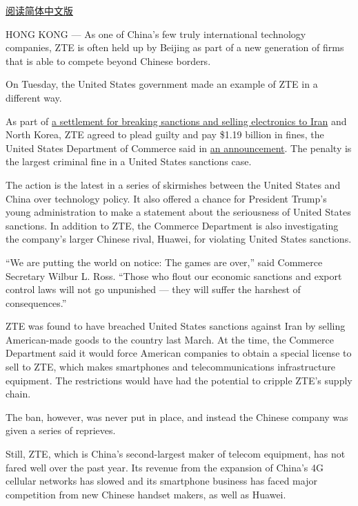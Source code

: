 \href{http://cn.nytimes.com/business/20170308/zte-china-fine/}{阅读简体中文版}

HONG KONG --- As one of China's few truly international technology
companies, ZTE is often held up by Beijing as part of a new generation
of firms that is able to compete beyond Chinese borders.

On Tuesday, the United States government made an example of ZTE in a
different way.

As part of
\href{https://www.nytimes.com/2016/03/08/technology/us-restricts-sales-to-zte-saying-it-breached-sanctions.html}{a
settlement for breaking sanctions and selling electronics to Iran} and
North Korea, ZTE agreed to plead guilty and pay \$1.19 billion in fines,
the United States Department of Commerce said in
\href{https://www.commerce.gov/news/press-releases/2017/03/secretary-commerce-wilbur-l-ross-jr-announces-119-billion-penalty}{an
announcement}. The penalty is the largest criminal fine in a United
States sanctions case.

The action is the latest in a series of skirmishes between the United
States and China over technology policy. It also offered a chance for
President Trump's young administration to make a statement about the
seriousness of United States sanctions. In addition to ZTE, the Commerce
Department is also investigating the company's larger Chinese rival,
Huawei, for violating United States sanctions.

``We are putting the world on notice: The games are over,'' said
Commerce Secretary Wilbur L. Ross. ``Those who flout our economic
sanctions and export control laws will not go unpunished --- they will
suffer the harshest of consequences.''

ZTE was found to have breached United States sanctions against Iran by
selling American-made goods to the country last March. At the time, the
Commerce Department said it would force American companies to obtain a
special license to sell to ZTE, which makes smartphones and
telecommunications infrastructure equipment. The restrictions would have
had the potential to cripple ZTE's supply chain.

The ban, however, was never put in place, and instead the Chinese
company was given a series of reprieves.

Still, ZTE, which is China's second-largest maker of telecom equipment,
has not fared well over the past year. Its revenue from the expansion of
China's 4G cellular networks has slowed and its smartphone business has
faced major competition from new Chinese handset makers, as well as
Huawei.

